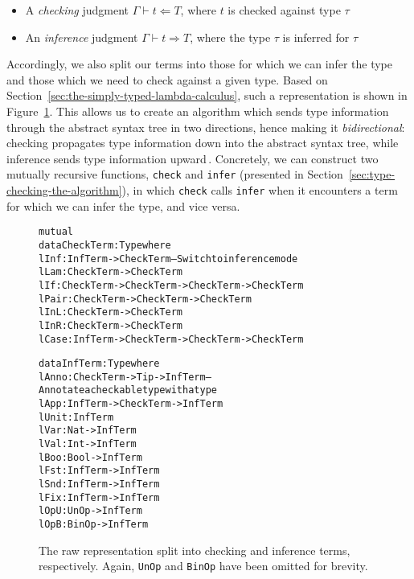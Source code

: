 \begin{itemize}
\item A \emph{checking} judgment $\Gamma \vdash t \Leftarrow T$, where $t$ is checked against type $\tau$
\item An \emph{inference} judgment $\Gamma \vdash t \Rightarrow T$, where the type $\tau$ is inferred for $\tau$
\end{itemize}

Accordingly, we also split our terms into those for which we can infer the type and those which we need to check against a given type. Based on Section~\ref{sec:the-simply-typed-lambda-calculus}, such a representation is shown in Figure~\ref{fig:bidirectional-terms}. This allows us to create an algorithm which sends type information through the abstract syntax tree in two directions, hence making it \emph{bidirectional}: checking propagates type information down into the abstract syntax tree, while inference sends type information upward\,\cite{Pfenning:bidirectional}. Concretely, we can construct two mutually recursive functions, \texttt{check} and \texttt{infer} (presented in Section~\ref{sec:type-checking-the-algorithm}), in which \texttt{check} calls \texttt{infer} when it encounters a term for which we can infer the type, and vice versa.

\begin{figure}
\begin{alltt}
mutual
 data CheckTerm : Type where
   lInf  : InfTerm -> CheckTerm -- Switch to inference mode
   lLam  : CheckTerm -> CheckTerm
   lIf   : CheckTerm -> CheckTerm -> CheckTerm -> CheckTerm
   lPair : CheckTerm -> CheckTerm -> CheckTerm
   lInL  : CheckTerm -> CheckTerm
   lInR  : CheckTerm -> CheckTerm
   lCase : InfTerm -> CheckTerm -> CheckTerm -> CheckTerm
   
 data InfTerm : Type where
   lAnno : CheckTerm -> Tip -> InfTerm -- Annotate a checkable type with a type
   lApp  : InfTerm -> CheckTerm -> InfTerm
   lUnit : InfTerm
   lVar  : Nat -> InfTerm
   lVal  : Int -> InfTerm
   lBoo  : Bool -> InfTerm
   lFst  : InfTerm -> InfTerm
   lSnd  : InfTerm -> InfTerm
   lFix  : InfTerm -> InfTerm
   lOpU  : UnOp -> InfTerm
   lOpB  : BinOp -> InfTerm
\end{alltt}
\caption{The raw representation split into checking and inference terms, respectively. Again, \texttt{UnOp} and \texttt{BinOp} have been omitted for brevity.}
\label{fig:bidirectional-terms}
\end{figure}

